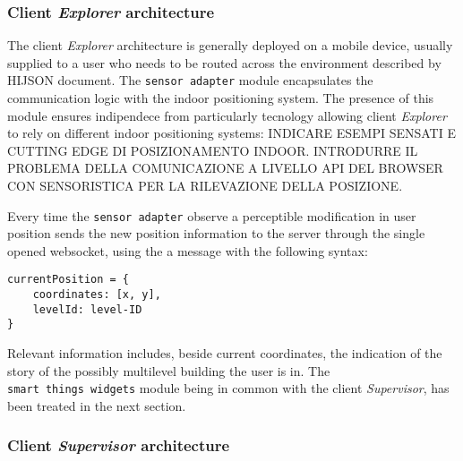 \documentclass[]{article}
\begin{document}
\subsubsection{\texorpdfstring{Client \emph{Explorer}
architecture}{Client Explorer architecture}}\label{client-explorer-architecture}

The client \emph{Explorer} architecture is generally deployed on a
mobile device, usually supplied to a user who needs to be routed across
the environment described by HIJSON document. The
\texttt{sensor\ adapter} module encapsulates the communication logic
with the indoor positioning system. The presence of this module ensures
indipendece from particularly tecnology allowing client \emph{Explorer}
to rely on different indoor positioning systems: INDICARE ESEMPI SENSATI
E CUTTING EDGE DI POSIZIONAMENTO INDOOR. INTRODURRE IL PROBLEMA DELLA
COMUNICAZIONE A LIVELLO API DEL BROWSER CON SENSORISTICA PER LA
RILEVAZIONE DELLA POSIZIONE.

Every time the \texttt{sensor\ adapter} observe a perceptible
modification in user position sends the new position information to the
server through the single opened websocket, using the a message with the
following syntax:

\begin{verbatim}
currentPosition = {
    coordinates: [x, y],
    levelId: level-ID  
}
\end{verbatim}

Relevant information includes, beside current coordinates, the
indication of the story of the possibly multilevel building the user is
in. The \texttt{smart\ things\ widgets} module being in common with the
client \emph{Supervisor}, has been treated in the next section.

\subsubsection{\texorpdfstring{Client \emph{Supervisor}
architecture}{Client Supervisor architecture}}\label{client-supervisor-architecture}
\end{document}
